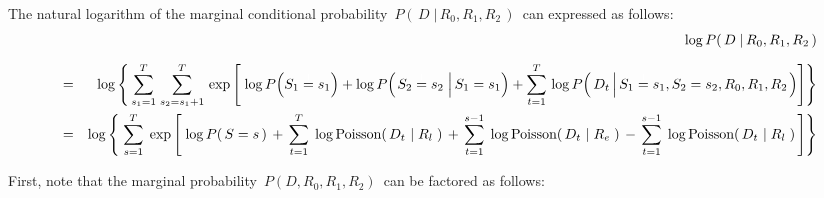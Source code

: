 \vskip 0.5cm
\begin{proposition}
\mbox{}
\vskip 0.2cm
\noindent
The natural logarithm of the marginal conditional probability
\,$P\!\left(\,D\;\vert\,R_{0},R_{1},R_{2}\,\right)$\,
can expressed as follows:
\begin{eqnarray*}
&&
	\underset{{\color{white}}}{\log P\!\left(\,D \;\vert\, R_{0},R_{1},R_{2}\,\right)}
\\
&=&
	\log\left\{\,
		\overset{T}{\underset{s_{1}=1}{\sum}}\;
		\overset{T}{\underset{s_{2}=s_{1}+1}{\sum}}\,
		\exp
		\left[\;
			\log P\!\left(S_{1}\overset{{\color{white}1}}{=}s_{1}\right)
			+
			\log P\!\left(\left.S_{2}\overset{{\color{white}1}}{=}s_{2}\;\right\vert S_{1}=s_{1}\right)
			+
			\overset{T}{\underset{t=1}{\sum}}\,
			\log P\!\left(\,D_{t}\left\vert\,S_{1}\overset{{\color{white}1}}{=}s_{1},S_{2}=s_{2},R_{0},R_{1},R_{2}\right.\right)
			\right]
		\right\}
\\
&=&
	\log\left\{\;
	\overset{T}{\underset{s=1}{\sum}}\;
	\exp\left[\;
			\log P\!\left(\,S=s\,\right)
			\,+\,
			\overset{T}{\underset{t=1}{\sum}}\;
			\log\textnormal{Poisson}\!\left(\,D_{t} \,\left\vert\; R_{l}\right.\,\right)
			\,+\,
			\overset{s-1}{\underset{t=1}{\sum}}\;
			\log\textnormal{Poisson}\!\left(\,D_{t} \,\left\vert\; R_{e}\right.\,\right)
			\,-\,
			\overset{s-1}{\underset{t=1}{\sum}}\;
			\log\textnormal{Poisson}\!\left(\,D_{t} \,\left\vert\; R_{l}\right.\,\right)
		\,\right]
	\right\}
\end{eqnarray*}
\end{proposition}
\proof
First, note that the marginal probability \,$P(D,R_{0},R_{1},R_{2})$\, can be factored as follows:
